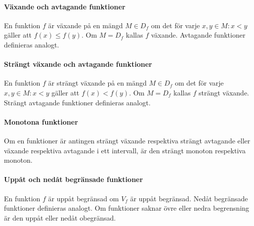 \paragraph{Växande och avtagande funktioner}

En funktion $f$ är växande på en mängd $M\in D_f$ om det för varje $x,y\in M: x<y$ gäller att $f(x)\leq f(y)$. Om $M=D_f$ kallas $f$ växande. Avtagande funktioner definieras analogt.

\paragraph{Strängt växande och avtagande funktioner}

En funktion $f$ är strängt växande på en mängd $M\in D_f$ om det för varje $x,y\in M: x<y$ gäller att $f(x)<f(y)$. Om $M=D_f$ kallas $f$ strängt växande. Strängt avtagande funktioner definieras analogt.

\paragraph{Monotona funktioner}

Om en funktioner är antingen strängt växande respektiva strängt avtagande eller växande respektiva avtagande i ett intervall, är den strängt monoton respektiva monoton.

\paragraph{Uppåt och nedåt begränsade funktioner}

En funktion $f$ är uppåt begränsad om $V_f$ är uppåt begränsad. Nedåt begränsade funktioner definieras analogt. Om funktioner saknar övre eller nedra begrensning är den uppåt eller nedåt obegränsad.

